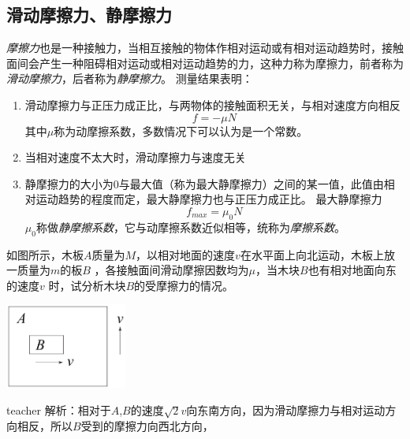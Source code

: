 \subsection{滑动摩擦力、静摩擦力}
\emph{摩擦力}也是一种接触力，当相互接触的物体作相对运动或有相对运动趋势时，接触面间会产生一种阻碍相对运动或相对运动趋势的力，这种力称为摩擦力，前者称为\emph{滑动摩擦力}，后者称为\emph{静摩擦力}。
测量结果表明：
\begin{enumerate}
\item 滑动摩擦力与正压力成正比，与两物体的接触面积无关，与相对速度方向相反
\begin{equation}
f=-\mu N
\end{equation}
其中$\mu$称为动摩擦系数，多数情况下可以认为是一个常数。
\item 当相对速度不太大时，滑动摩擦力与速度无关
\item 静摩擦力的大小为0与最大值（称为最大静摩擦力）之间的某一值，此值由相对运动趋势的程度而定，最大静摩擦力也与正压力成正比。
最大静摩擦力
\begin{equation}\label{eqn: force-最大静摩擦}
f_{max}= \mu_0 N
\end{equation}
$\mu_0$称做\emph{静摩擦系数}，它与动摩擦系数近似相等，统称为\emph{摩擦系数}。
\end{enumerate}


\begin{example}

如图所示，木板$A$质量为$M$，以相对地面的速度$v$在水平面上向北运动，木板上放一质量为$m$的板$B$ ，各接触面间滑动摩擦因数均为$\mu$，当木块$B$也有相对地面向东的速度$v$ 时，试分析木块$B$的受摩擦力的情况。
\begin{flushright}
\includegraphics[width = 0.3\textwidth]{images/static-force-8.pdf} 
\end{flushright}
\begin{taggedblock}{teacher}
\vspace*{3cm}
\noindent
解析：相对于$A$,$B$的速度$\sqrt{2}v$向东南方向，因为滑动摩擦力与相对运动方向相反，所以$B$受到的摩擦力向西北方向，
\end{taggedblock}
\end{example}


